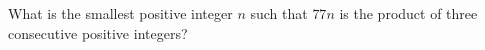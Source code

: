 What is the smallest positive integer $n$ such that $77n$ is the product of three consecutive positive integers?
